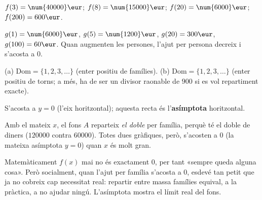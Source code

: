 \begin{solucions}
\begin{sollist}
  \item $f(3)=\num{40000}\eur$; \quad $f(8)=\num{15000}\eur$; \quad
        $f(20)=\num{6000}\eur$; \quad $f(200)=600\eur$.
  \item $g(1)=\num{6000}\eur$, $g(5)=\num{1200}\eur$, $g(20)=300\eur$,
        $g(100)=60\eur$. Quan augmenten les persones, l'ajut per persona decreix i
        s'acosta a $0$.
  \item (a) $\mathrm{Dom}=\{1,2,3,\dots\}$ (enter positiu de famílies). \quad
        (b) $\mathrm{Dom}=\{1,2,3,\dots\}$ (enter positiu de torns; a més, ha de ser
        un divisor raonable de $900$ si es vol repartiment exacte).
  \item S'acosta a $y=0$ (l'eix horitzontal); aquesta recta és l'\textbf{asímptota}
        horitzontal.
  \item Amb el mateix $x$, el fons $A$ reparteix \emph{el doble} per família, perquè
        té el doble de diners ($\num{120000}$ contra $\num{60000}$). Totes dues
        gràfiques, però, s'acosten a $0$ (la mateixa asímptota $y=0$) quan $x$ és molt
        gran.
  \item Matemàticament $f(x)$ mai no és exactament $0$, per tant «sempre queda alguna
        cosa». Però socialment, quan l'ajut per família s'acosta a $0$, esdevé tan
        petit que ja no cobreix cap necessitat real: repartir entre massa famílies
        equival, a la pràctica, a no ajudar ningú. L'asímptota mostra el límit real
        del fons.
\end{sollist}
\end{solucions}
